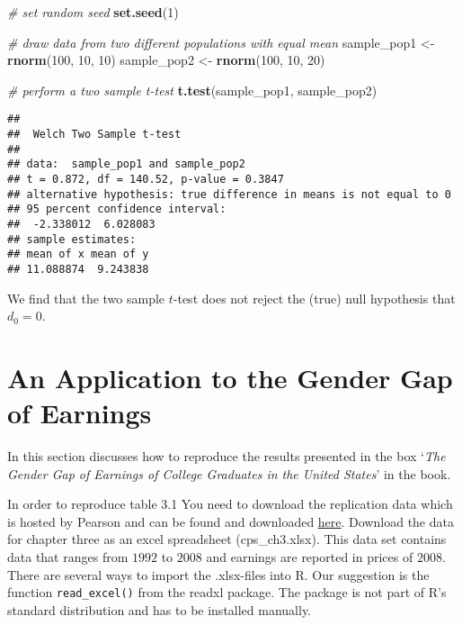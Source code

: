 \documentclass[]{book}
\newenvironment{Shaded}{\begin{snugshade}}{\end{snugshade}}
\newcommand{\KeywordTok}[1]{\textcolor[rgb]{0.13,0.29,0.53}{\textbf{#1}}}
\newcommand{\DecValTok}[1]{\textcolor[rgb]{0.00,0.00,0.81}{#1}}
\newcommand{\StringTok}[1]{\textcolor[rgb]{0.31,0.60,0.02}{#1}}
\newcommand{\CommentTok}[1]{\textcolor[rgb]{0.56,0.35,0.01}{\textit{#1}}}
\newcommand{\NormalTok}[1]{#1}
\theoremstyle{definition}
\theoremstyle{definition}
\theoremstyle{definition}
\theoremstyle{remark}
\begin{document}
\begin{Shaded}
\begin{Highlighting}[]
\CommentTok{# set random seed}
\KeywordTok{set.seed}\NormalTok{(}\DecValTok{1}\NormalTok{)}

\CommentTok{# draw data from two different populations with equal mean}
\NormalTok{sample_pop1 <-}\StringTok{ }\KeywordTok{rnorm}\NormalTok{(}\DecValTok{100}\NormalTok{, }\DecValTok{10}\NormalTok{, }\DecValTok{10}\NormalTok{)}
\NormalTok{sample_pop2 <-}\StringTok{ }\KeywordTok{rnorm}\NormalTok{(}\DecValTok{100}\NormalTok{, }\DecValTok{10}\NormalTok{, }\DecValTok{20}\NormalTok{)}

\CommentTok{# perform a two sample t-test}
\KeywordTok{t.test}\NormalTok{(sample_pop1, sample_pop2)}
\end{Highlighting}
\end{Shaded}

\begin{verbatim}
## 
##  Welch Two Sample t-test
## 
## data:  sample_pop1 and sample_pop2
## t = 0.872, df = 140.52, p-value = 0.3847
## alternative hypothesis: true difference in means is not equal to 0
## 95 percent confidence interval:
##  -2.338012  6.028083
## sample estimates:
## mean of x mean of y 
## 11.088874  9.243838
\end{verbatim}

We find that the two sample \(t\)-test does not reject the (true) null
hypothesis that \(d_0 = 0\).

\section{An Application to the Gender Gap of
Earnings}\label{an-application-to-the-gender-gap-of-earnings}

In this section discusses how to reproduce the results presented in the
box `\emph{The Gender Gap of Earnings of College Graduates in the United
States}' in the book.

In order to reproduce table 3.1 You need to download the replication
data which is hosted by Pearson and can be found and downloaded
\href{http://wps.aw.com/aw_stock_ie_3/178/45691/11696965.cw/index.html}{here}.
Download the data for chapter three as an excel spreadsheet
(cps\_ch3.xlsx). This data set contains data that ranges from \(1992\)
to \(2008\) and earnings are reported in prices of \(2008\). There are
several ways to import the .xlsx-files into R. Our suggestion is the
function \texttt{read\_excel()} from the readxl package. The package is
not part of R's standard distribution and has to be installed manually.
\end{document}
